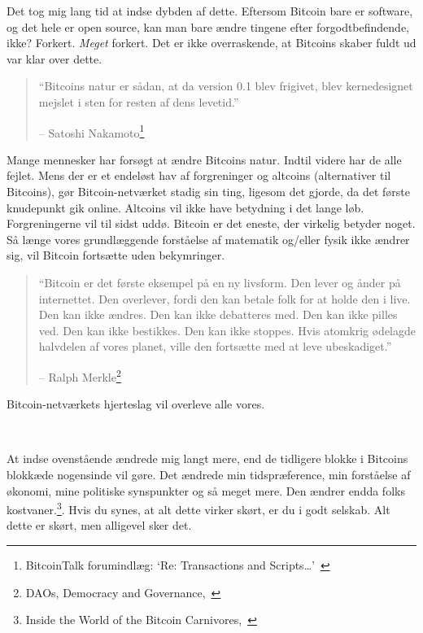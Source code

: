 \documentclass[paper=6in:9in,pagesize=pdftex,headinclude=on,footinclude=on,12pt]{scrbook}
\begin{document}
Det tog mig lang tid at indse dybden af dette. Eftersom Bitcoin bare er software, og det hele er open source, kan man bare ændre tingene efter forgodtbefindende, ikke? Forkert. \textit{Meget} forkert. Det er ikke overraskende, at Bitcoins skaber fuldt ud var klar over dette.\begin{quotation}\begin{samepage} \enquote{Bitcoins natur er sådan, at da version 0.1 blev frigivet, blev kernedesignet mejslet i sten for resten af dens levetid.} \begin{flushright} -- Satoshi Nakamoto\footnote{BitcoinTalk forumindlæg: `Re: Transactions and Scripts\ldots'~\cite{satoshi-set-in-stone}}
\end{flushright}\end{samepage}\end{quotation}

Mange mennesker har forsøgt at ændre Bitcoins natur. Indtil videre har de alle fejlet. Mens der er et endeløst hav af forgreninger og altcoins (alternativer til Bitcoins), gør Bitcoin-netværket stadig sin ting, ligesom det gjorde, da det første knudepunkt gik online. Altcoins vil ikke have betydning i det lange løb. Forgreningerne vil til sidst uddø. Bitcoin er det eneste, der virkelig betyder noget. Så længe vores grundlæggende forståelse af matematik og/eller fysik ikke ændrer sig, vil Bitcoin fortsætte uden bekymringer.\begin{quotation}\begin{samepage}
\enquote{Bitcoin er det første eksempel på en ny livsform. Den lever og ånder på internettet. Den overlever, fordi den kan betale folk for at holde den i live. Den kan ikke ændres. Den kan ikke debatteres med. Den kan ikke pilles ved. Den kan ikke bestikkes. Den kan ikke stoppes. Hvis atomkrig ødelagde halvdelen af vores planet, ville den fortsætte med at leve ubeskadiget.}
\begin{flushright} -- Ralph Merkle\footnote{DAOs, Democracy and Governance,~\cite{merkle-dao}}
\end{flushright}\end{samepage}\end{quotation}

Bitcoin-netværkets hjerteslag vil overleve alle vores.

~

At indse ovenstående ændrede mig langt mere, end de tidligere blokke i Bitcoins blokkæde nogensinde vil gøre. Det ændrede min tidspræference, min forståelse af økonomi, mine politiske synspunkter og så meget mere. Den ændrer endda folks kostvaner.\footnote{Inside the World of the Bitcoin Carnivores,~\cite{carnivores}}. Hvis du synes, at alt dette virker skørt, er du i godt selskab. Alt dette er skørt, men alligevel sker det.
\end{document}
